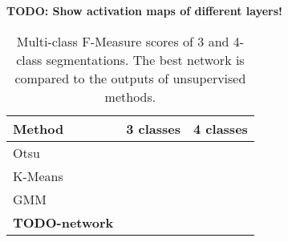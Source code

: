 \textbf{TODO: Show activation maps of different layers!}\\


\begin {table}
	\centering
	\begin {tabular}[!ht]{|l|c|c|}
		\hline
		\textbf{Method}& \textbf{3 classes}& \textbf{4 classes}\\ \hline
		Otsu& & \\ \hline
		K-Means& & \\ \hline
		GMM& & \\ \hline
		\textbf{TODO-network}& & \\ \hline
	\end {tabular}
\caption[Multi-class F-Measure scores of the best network in comparison to the unsupervised methods.]{Multi-class F-Measure scores of 3 and 4-class segmentations. The best network is compared to the outputs of unsupervised methods.}
\end {table}